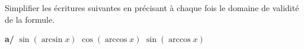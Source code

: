 
\begin{exercice}\label{exoautoanalyseCTU-8}



Simplifier les écritures suivantes en précisant à chaque fois le domaine de validité de la formule.

{\bfseries a/} $\sin(\arcsin x)$  $\cos(\arccos x)$  $\sin(\arccos x)$








\end{exercice}
